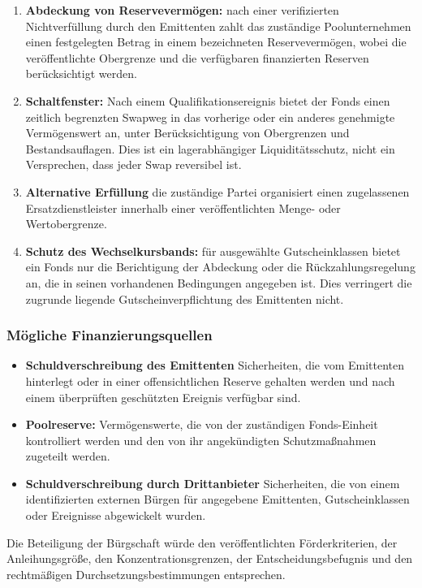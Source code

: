 \documentclass[11pt]{article}
\begin{document}
\begin{enumerate}[leftmargin=*]
\item \textbf{Abdeckung von Reservevermögen:} nach einer verifizierten Nichtverfüllung durch den Emittenten zahlt das zuständige Poolunternehmen einen festgelegten Betrag in einem bezeichneten Reservevermögen, wobei die veröffentlichte Obergrenze und die verfügbaren finanzierten Reserven berücksichtigt werden.
\item \textbf{Schaltfenster:} Nach einem Qualifikationsereignis bietet der Fonds einen zeitlich begrenzten Swapweg in das vorherige oder ein anderes genehmigte Vermögenswert an, unter Berücksichtigung von Obergrenzen und Bestandsauflagen. Dies ist ein lagerabhängiger Liquiditätsschutz, nicht ein Versprechen, dass jeder Swap reversibel ist.
\item \textbf{Alternative Erfüllung} die zuständige Partei organisiert einen zugelassenen Ersatzdienstleister innerhalb einer veröffentlichten Menge- oder Wertobergrenze.
\item \textbf{Schutz des Wechselkursbands:} für ausgewählte Gutscheinklassen bietet ein Fonds nur die Berichtigung der Abdeckung oder die Rückzahlungsregelung an, die in seinen vorhandenen Bedingungen angegeben ist. Dies verringert die zugrunde liegende Gutscheinverpflichtung des Emittenten nicht.
\end{enumerate}
\subsubsection*{Mögliche Finanzierungsquellen}

\begin{itemize}[leftmargin=*]
\item \textbf{Schuldverschreibung des Emittenten} Sicherheiten, die vom Emittenten hinterlegt oder in einer offensichtlichen Reserve gehalten werden und nach einem überprüften geschützten Ereignis verfügbar sind.
\item \textbf{Poolreserve:} Vermögenswerte, die von der zuständigen Fonds-Einheit kontrolliert werden und den von ihr angekündigten Schutzmaßnahmen zugeteilt werden.
\item \textbf{Schuldverschreibung durch Drittanbieter} Sicherheiten, die von einem identifizierten externen Bürgen für angegebene Emittenten, Gutscheinklassen oder Ereignisse abgewickelt wurden.
\end{itemize}
Die Beteiligung der Bürgschaft würde den veröffentlichten Förderkriterien, der Anleihungsgröße, den Konzentrationsgrenzen, der Entscheidungsbefugnis und den rechtmäßigen Durchsetzungsbestimmungen entsprechen.
\end{document}

